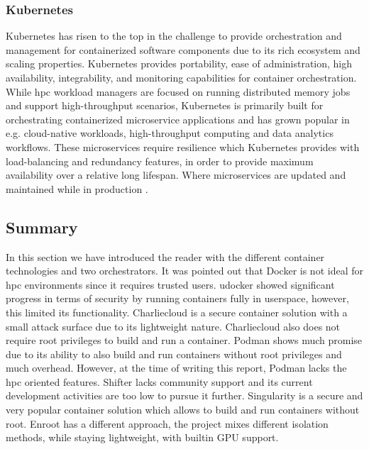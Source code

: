 \documentclass[conference]{IEEEtran}
\begin{document}
\subsubsection{Kubernetes}
Kubernetes has risen to the top in the challenge to provide orchestration and management for containerized software components due to its rich ecosystem and scaling properties. Kubernetes provides portability, ease of administration, high availability, integrability, and monitoring capabilities for container orchestration. While \gls{hpc} workload managers are focused on running distributed memory jobs and support high-throughput scenarios, Kubernetes is primarily built for orchestrating containerized microservice applications and has grown popular in e.g. cloud-native workloads, high-throughput computing and data analytics workflows. These microservices require resilience which Kubernetes provides with load-balancing and redundancy features, in order to provide maximum availability over a relative long lifespan. Where microservices are updated and maintained while in production \cite{hpc-kubernetes-containers}.







\subsection{Summary}
In this section we have introduced the reader with the different container technologies and two orchestrators. It was pointed out that Docker is not ideal for \gls{hpc} environments since it requires trusted users. udocker showed significant progress in terms of security by running containers fully in userspace, however, this limited its functionality. Charliecloud is a secure container solution with a small attack surface due to its lightweight nature. Charliecloud also does not require root privileges to build and run a container. Podman shows much promise due to its ability to also build and run containers without root privileges and much overhead. However, at the time of writing this report, Podman lacks the \gls{hpc} oriented features. Shifter lacks community support and its current development activities are too low to pursue it further. Singularity is a secure and very popular container solution which allows to build and run containers without root. Enroot has a different approach, the project mixes different isolation methods, while staying lightweight, with builtin GPU support.
\end{document}

